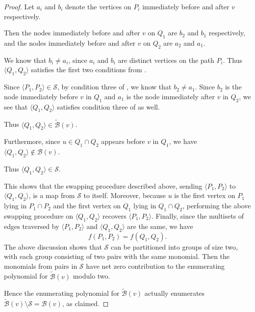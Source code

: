 \documentclass[11pt]{article}
\newcommand{\set}[1]{\left\{#1\right\}}
\newcommand{\pair}[1]{\langle #1\rangle}
\newcommand{\ca}{\mathcal}
\theoremstyle{definition}
\begin{document}
\begin{proof}
    Let $a_i$ and $b_i$ denote the vertices on $P_i$ immediately before and after $v$ respectively.

    Then the nodes immediately before and after $v$ on $Q_1$ are $b_2$ and $b_1$ respectively, and the nodes immediately before and after $v$ on $Q_2$ are $a_2$ and $a_1$.
    
    We know that $b_i\neq a_i$, since $a_i$ and $b_i$ are distinct vertices on the path $P_i$.
    Thus $\langle Q_1,Q_2\rangle$ satisfies the first two conditions from .
    
    Since $\langle P_1,P_2\rangle\in\ca{S}$, by condition three of , we know that $b_2\neq a_1$.
    Since $b_2$ is the node immediately before $v$ in $Q_1$ and $a_1$ is the node immediately after $v$ in $Q_2$, we see that $\langle Q_1,Q_2\rangle$ satisfies condition three of  as well.
    
Thus  $\langle Q_1,Q_2\rangle\in\tilde{\ca{B}}(v)$.

    Furthermore, since $u\in Q_1\cap Q_2$ appears before $v$ in $Q_1$, we have $\pair{Q_1,Q_2}\not\in\ca{B}(v)$.

    Thus $\pair{Q_1,Q_2}\in\ca{S}$.

    This shows that the swapping procedure described above, sending $\pair{P_1,P_2}$ to $\pair{Q_1,Q_2}$, is a map from $\ca{S}$ to itself.
    Moreover, because $u$ is the first vertex on $P_1$ lying in $P_1\cap P_2$ and the first vertex on $Q_1$ lying in $Q_1\cap Q_2$, performing the above swapping procedure on $\pair{Q_1,Q_2}$ recovers $\pair{P_1,P_2}$.
    Finally, since the multisets of edges traversed by $\pair{P_1,P_2}$ and $\pair{Q_1,Q_2}$ are the same, we have 
        \[f(P_1,P_2) = f(Q_1,Q_2).\]
    The above discussion shows that $\ca{S}$ can be partitioned into groups of size two, with each group consisting of two pairs with the same monomial.
    Then the monomials from pairs in $\ca{S}$ have net zero contribution to the enumerating polynomial for $\tilde{\ca{B}}(v)$ modulo two.
    
    Hence the enumerating polynomial for $\tilde{\ca{B}}(v)$ actually enumerates $\tilde{\ca{B}}(v)\setminus\ca{S} = \ca{B}(v)$, as claimed.
\end{proof}
\end{document}
